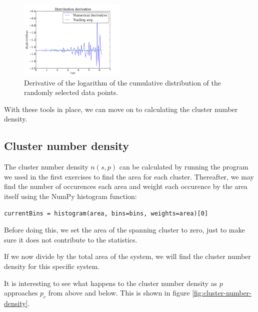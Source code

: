 \documentclass[a4paper,reprint,floatfix,amsmath,amssymb,aps,pra]{revtex4-1}
\begin{document}
\begin{figure}
  \centering
  \includegraphics[width=0.45\textwidth]{../percolation/results/1c/distribution-derivative.pdf}
  \caption{Derivative of the logarithm of the cumulative distribution of the randomly selected data points.}
  \label{fig:powerlaw-distribution-derivative}
\end{figure}

With these tools in place, we can move on to calculating the cluster number density.

\subsection{Cluster number density}

The cluster number density $n(s,p)$ can be calculated by running the program we used in the first exercises to find the area for each cluster. Thereafter, we may find the number of occurences each area and weight each occurence by the area itself using the NumPy histogram function:
\begin{lstlisting}
currentBins = histogram(area, bins=bins, weights=area)[0]
\end{lstlisting}
Before doing this, we set the area of the spanning cluster to zero, just to make sure it does not contribute to the statistics.

If we now divide by the total area of the system, we will find the cluster number density for this specific system.

It is interesting to see what happens to the cluster number density as $p$ approaches $p_c$ from above and below. This is shown in figure \ref{fig:cluster-number-density}.
\end{document}
